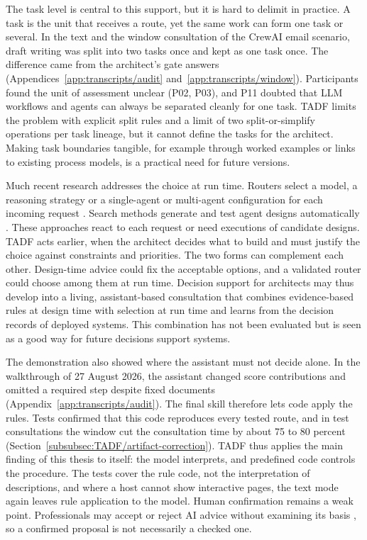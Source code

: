 The task level is central to this support, but it is hard to delimit in practice. A task is the unit that receives a route, yet the same work can form one task or several. In the text and the window consultation of the CrewAI email scenario, draft writing was split into two tasks once and kept as one task once. The difference came from the architect's gate answers (Appendices~\ref{app:transcripts/audit} and~\ref{app:transcripts/window}). Participants found the unit of assessment unclear (P02, P03), and P11 doubted that LLM workflows and agents can always be separated cleanly for one task. TADF limits the problem with explicit split rules and a limit of two split-or-simplify operations per task lineage, but it cannot define the tasks for the architect. Making task boundaries tangible, for example through worked examples or links to existing process models, is a practical need for future versions.

Much recent research addresses the choice at run time. Routers select a model, a reasoning strategy or a single-agent or multi-agent configuration for each incoming request \parencite{gaoSingleagentMultiagentSystems2025,suDifficultyAwareAgenticOrchestration2025,zhouSelectthenSolveParadigmRouting2026}. Search methods generate and test agent designs automatically \parencite{huAutomatedDesignAgentic2024}. These approaches react to each request or need executions of candidate designs. TADF acts earlier, when the architect decides what to build and must justify the choice against constraints and priorities. The two forms can complement each other. Design-time advice could fix the acceptable options, and a validated router could choose among them at run time. Decision support for architects may thus develop into a living, assistant-based consultation that combines evidence-based rules at design time with selection at run time and learns from the decision records of deployed systems. This combination has not been evaluated but is seen as a good way for future decisions support systems.

The demonstration also showed where the assistant must not decide alone. In the walkthrough of 27 August 2026, the assistant changed score contributions and omitted a required step despite fixed documents (Appendix~\ref{app:transcripts/audit}). The final skill therefore lets code apply the rules. Tests confirmed that this code reproduces every tested route, and in test consultations the window cut the consultation time by about 75 to 80 percent (Section~\ref{subsubsec:TADF/artifact-correction}). TADF thus applies the main finding of this thesis to itself: the model interprets, and predefined code controls the procedure. The tests cover the rule code, not the interpretation of descriptions, and where a host cannot show interactive pages, the text mode again leaves rule application to the model. Human confirmation remains a weak point. Professionals may accept or reject AI advice without examining its basis \parencite{jussupowAugmentingMedicalDiagnosis2021,lebovitzEngageNotEngage2022}, so a confirmed proposal is not necessarily a checked one.

